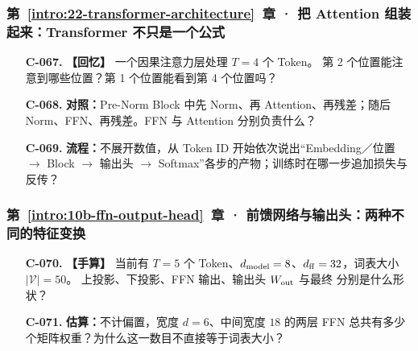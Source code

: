 \subsubsection*{第~\ref*{intro:22-transformer-architecture}~章 · 把 Attention 组装起来：Transformer 不只是一个公式}
\begin{enumerate}[label={},leftmargin=4.8em,itemsep=4pt]
\item[\textbf{C-067.}] \leavevmode{}\label{exercise:C-067}\label{exercise:causal-position-visibility}\label{exercise:linked-22-transformer-architecture}  \textbf{【回忆】} 一个因果注意力层处理 $T=4$ 个 Token。
第 2 个位置能注意到哪些位置？第 1 个位置能看到第 4 个位置吗？
\item[\textbf{C-068.}] \leavevmode{}\label{exercise:C-068}\label{exercise:block-branch-roles}\textbf{对照：}Pre-Norm Block 中先 Norm、再 Attention、再残差；随后 Norm、FFN、再残差。FFN 与 Attention 分别负责什么？
\item[\textbf{C-069.}] \leavevmode{}\label{exercise:C-069}\label{exercise:token-to-loss-pipeline}\textbf{流程：}不展开数值，从 Token ID 开始依次说出“Embedding／位置 $\to$ Block $\to$ 输出头 $\to$ Softmax”各步的产物；训练时在哪一步追加损失与反传？
\end{enumerate}
\subsubsection*{第~\ref*{intro:10b-ffn-output-head}~章 · 前馈网络与输出头：两种不同的特征变换}
\begin{enumerate}[label={},leftmargin=4.8em,itemsep=4pt]
\item[\textbf{C-070.}] \leavevmode{}\label{exercise:C-070}\label{exercise:ffn-output-shapes}\label{exercise:linked-10b-ffn-output-head}  \textbf{【手算】} 当前有 $T=5$ 个 Token、$d_{\rm model}=8$、$d_{\rm ff}=32$，词表大小 $|\mathcal V|=50$。 上投影、下投影、FFN 输出、输出头 $W_{\rm out}$ 与最终  分别是什么形状？
\item[\textbf{C-071.}] \leavevmode{}\label{exercise:C-071}\label{exercise:ffn-weight-count}\textbf{估算：}不计偏置，宽度 $d=6$、中间宽度 $18$ 的两层 FFN 总共有多少个矩阵权重？为什么这一数目不直接等于词表大小？
\end{enumerate}
